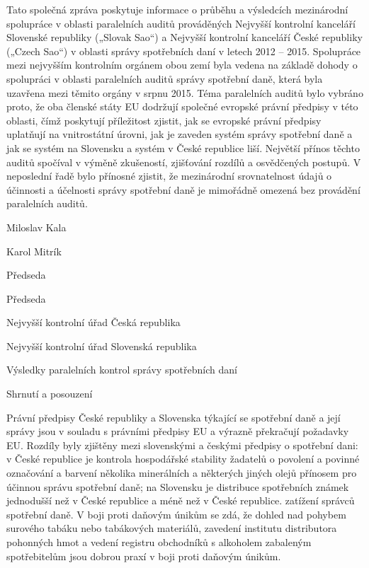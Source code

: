 \documentclass[10pt]{article}
\begin{document}
Tato společná zpráva poskytuje informace o průběhu a výsledcích mezinárodní spolupráce v oblasti paralelních auditů prováděných Nejvyšší kontrolní kanceláří Slovenské republiky („Slovak Sao“) a Nejvyšší kontrolní kanceláří České republiky („Czech Sao“) v oblasti správy spotřebních daní v letech 2012 – 2015.
Spolupráce mezi nejvyšším kontrolním orgánem obou zemí byla vedena na základě dohody o spolupráci v oblasti paralelních auditů správy spotřební daně, která byla uzavřena mezi těmito orgány v srpnu 2015.
Téma paralelních auditů bylo vybráno proto, že oba členské státy EU dodržují společné evropské právní předpisy v této oblasti, čímž poskytují příležitost zjistit, jak se evropské právní předpisy uplatňují na vnitrostátní úrovni, jak je zaveden systém správy spotřební daně a jak se systém na Slovensku a systém v České republice liší.
Největší přínos těchto auditů spočíval v výměně zkušeností, zjišťování rozdílů a osvědčených postupů.
V neposlední řadě bylo přínosné zjistit, že mezinárodní srovnatelnost údajů o účinnosti a účelnosti správy spotřební daně je mimořádně omezená bez provádění paralelních auditů.


Miloslav Kala



Karol Mitrík



Předseda



Předseda



Nejvyšší kontrolní úřad Česká republika



Nejvyšší kontrolní úřad Slovenská republika



Výsledky paralelních kontrol správy spotřebních daní



Shrnutí a posouzení

Právní předpisy České republiky a Slovenska týkající se spotřební daně a její správy jsou v souladu s právními předpisy EU a výrazně překračují požadavky EU.
Rozdíly byly zjištěny mezi slovenskými a českými předpisy o spotřební dani: v České republice je kontrola hospodářské stability žadatelů o povolení a povinné označování a barvení několika minerálních a některých jiných olejů přínosem pro účinnou správu spotřební daně; na Slovensku je distribuce spotřebních známek jednodušší než v České republice a méně než v České republice. zatížení správců spotřební daně.
V boji proti daňovým únikům se zdá, že dohled nad pohybem surového tabáku nebo tabákových materiálů, zavedení institutu distributora pohonných hmot a vedení registru obchodníků s alkoholem zabaleným spotřebitelům jsou dobrou praxí v boji proti daňovým únikům.
\end{document}
